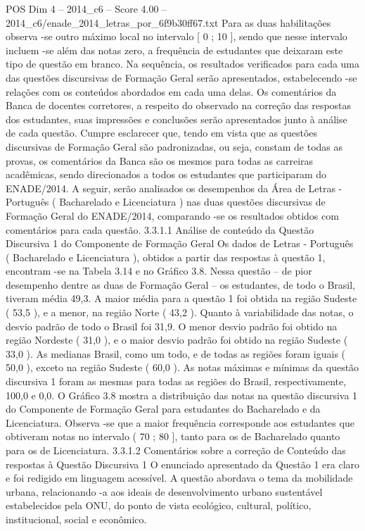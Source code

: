 \begin{textsample}{POS Dim 4 – 2014\_c6 – Score 4.00 – 2014\_c6/enade\_2014\_letras\_por\_6f9b30ff67.txt}
Para as duas habilitações observa -se outro máximo local no intervalo [ 0 ; 10 ], sendo que nesse intervalo incluem -se além das notas zero, a frequência de estudantes que deixaram este tipo de questão em branco.
Na sequência, os resultados verificados para cada uma das questões discursivas de Formação Geral serão apresentados, estabelecendo -se relações com os conteúdos abordados em cada uma delas.
Os comentários da Banca de docentes corretores, a respeito do observado na correção das respostas dos estudantes, suas impressões e conclusões serão apresentados junto à análise de cada questão.
Cumpre esclarecer que, tendo em vista que as questões discursivas de Formação Geral são padronizadas, ou seja, constam de todas as provas, os comentários da Banca são os mesmos para todas as carreiras acadêmicas, sendo direcionados a todos os estudantes que participaram do ENADE/2014.
A seguir, serão analisados os desempenhos da Área de Letras - Português ( Bacharelado e Licenciatura ) nas duas questões discursivas de Formação Geral do ENADE/2014, comparando -se os resultados obtidos com comentários para cada questão. 3.3.1.1 Análise de conteúdo da Questão Discursiva 1 do Componente de Formação Geral Os dados de Letras - Português ( Bacharelado e Licenciatura ), obtidos a partir das respostas à questão 1, encontram -se na Tabela 3.14 e no Gráfico 3.8.
Nessa questão – de pior desempenho dentre as duas de Formação Geral – os estudantes, de todo o Brasil, tiveram média 49,3.
A maior média para a questão 1 foi obtida na região Sudeste ( 53,5 ), e a menor, na região Norte ( 43,2 ).
Quanto à variabilidade das notas, o desvio padrão de todo o Brasil foi 31,9.
O menor desvio padrão foi obtido na região Nordeste ( 31,0 ), e o maior desvio padrão foi obtido na região Sudeste ( 33,0 ).
As medianas Brasil, como um todo, e de todas as regiões foram iguais ( 50,0 ), exceto na região Sudeste ( 60,0 ).
As notas máximas e mínimas da questão discursiva 1 foram as mesmas para todas as regiões do Brasil, respectivamente, 100,0 e 0,0.
O Gráfico 3.8 mostra a distribuição das notas na questão discursiva 1 do Componente de Formação Geral para estudantes do Bacharelado e da Licenciatura.
Observa -se que a maior frequência corresponde aos estudantes que obtiveram notas no intervalo ( 70 ; 80 ], tanto para os de Bacharelado quanto para os de Licenciatura. 3.3.1.2 Comentários sobre a correção de Conteúdo das respostas à Questão Discursiva 1 O enunciado apresentado da Questão 1 era claro e foi redigido em linguagem acessível.
A questão abordava o tema da mobilidade urbana, relacionando -a aos ideais de desenvolvimento urbano sustentável estabelecidos pela ONU, do ponto de vista ecológico, cultural, político, institucional, social e econômico.

\end{textsample}
